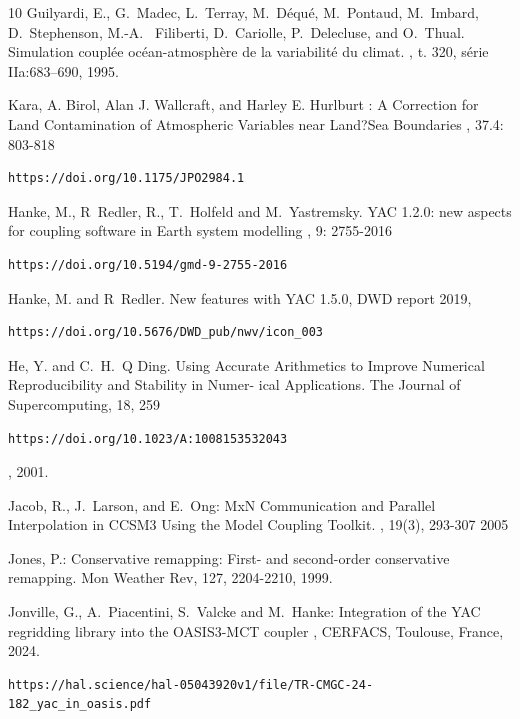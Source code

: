 \begin{thebibliography}{10}
Guilyardi, E., G.~Madec, L.~Terray, M.~D\'equ\'e, M.~Pontaud, M.~Imbard, D.~Stephenson, M.-A. ~Filiberti, D.~Cariolle, P.~Delecluse, and O.~Thual.
\newblock Simulation coupl\'ee oc\'ean-atmosph\`ere de la variabilit\'e du climat.
, t. 320, s\'erie IIa:683--690, 1995.

Kara, A. Birol, Alan J. Wallcraft, and Harley E. Hurlburt :
\newblock A Correction for Land Contamination of Atmospheric Variables near Land?Sea Boundaries
, 37.4: 803-818  \begin{verbatim}https://doi.org/10.1175/JPO2984.1\end{verbatim}

Hanke, M., R~Redler, R., T.~Holfeld and M.~Yastremsky.
\newblock YAC 1.2.0: new aspects for coupling software in Earth system modelling
, 9: 2755-2016
\newblock  \begin{verbatim}https://doi.org/10.5194/gmd-9-2755-2016\end{verbatim}

Hanke, M. and R~Redler.
\newblock New features with YAC 1.5.0, 
\newblock DWD report 2019,  \begin{verbatim}https://doi.org/10.5676/DWD_pub/nwv/icon_003\end{verbatim}

He, Y. and C.~H.~Q Ding.
\newblock Using Accurate Arithmetics to Improve Numerical Reproducibility and Stability in Numer- ical Applications.
\newblock The Journal of Supercomputing, 18, 259
\newblock  \begin{verbatim}https://doi.org/10.1023/A:1008153532043\end{verbatim}, 2001.

Jacob, R., J.~Larson, and E.~Ong:
\newblock MxN Communication and Parallel Interpolation in CCSM3 Using the Model Coupling Toolkit.
, 19(3), 293-307 2005

Jones, P.:
\newblock Conservative remapping: First- and second-order conservative remapping.
\newblock Mon Weather Rev, 127, 2204-2210, 1999.

Jonville, G., A.~Piacentini, S.~Valcke and M.~Hanke:
\newblock Integration of the YAC regridding library into the OASIS3-MCT coupler
,
\newblock CERFACS, Toulouse, France, 2024.
\newblock  \begin{verbatim}https://hal.science/hal-05043920v1/file/TR-CMGC-24-182_yac_in_oasis.pdf\end{verbatim}


\end{thebibliography}
